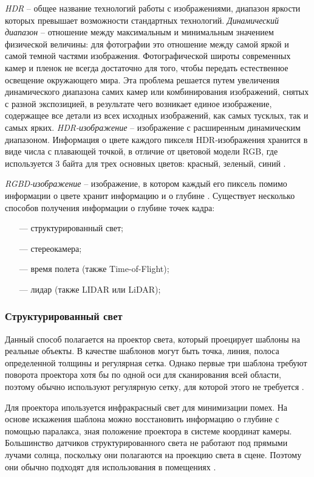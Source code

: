 \textit{HDR} -- общее название технологий работы с изображениями, диапазон яркости которых превышает возможности стандартных технологий. \textit{Динамический диапазон} -- отношение между максимальным и минимальным значением физической величины: для фотографии это отношение между самой яркой и самой темной частями изображения. Фотографической широты современных камер и пленок не всегда достаточно для того, чтобы передать естественное освещение окружающего мира. Эта проблема решается путем увеличения динамического диапазона самих камер или комбинирования изображений, снятых с разной экспозицией, в результате чего возникает единое изображение, содержащее все детали из всех исходных изображений, как самых тусклых, так и самых ярких. \textit{HDR-изображение} -- изображение с расширенным динамическим диапазоном. Информация о цвете каждого пикселя HDR-изображения хранится в виде числа с плавающей точкой, в отличие от цветовой модели RGB, где используется 3 байта для трех основных цветов: красный, зеленый, синий \cite{hdri}.

\textit{RGBD-изображение} -- изображение, в котором каждый его пиксель помимо информации о цвете хранит информацию и о глубине \cite{rgbd}. Существует несколько способов получения информации о глубине точек кадра:

\begin{itemize}
	\item[---] структурированный свет;
	\item[---] стереокамера;
	\item[---] время полета (также Time-of-Flight);
	\item[---] лидар (также LIDAR или LiDAR);
\end{itemize}

\subsubsection*{Структурированный свет}

Данный способ полагается на проектор света, который проецирует шаблоны на реальные объекты. В качестве шаблонов могут быть точка, линия, полоса определенной толщины и регулярная сетка. Однако первые три шаблона требуют поворота проектора хотя бы по одной оси для сканирования всей области, поэтому обычно используют регулярную сетку, для которой этого не требуется \cite{struct_light}. 

Для проектора ипользуется инфракрасный свет для минимизации помех. На основе искажения шаблона можно восстановить информацию о глубине с помощью паралакса, зная положение проектора в системе координат камеры. Большинство датчиков структурированного света не работают под прямыми лучами солнца, поскольку они полагаются на проекцию света в сцене. Поэтому они обычно подходят для использования в помещениях \cite{struct_light}.

